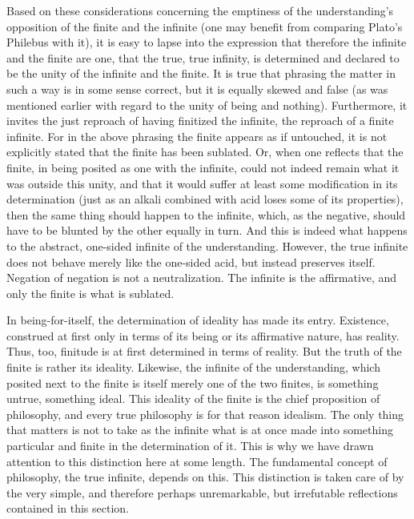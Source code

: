 Based on these considerations concerning the emptiness of
the understanding's opposition of the finite and the infinite
(one may benefit from comparing Plato's Philebus with it),
it is easy to lapse into the expression that therefore
the infinite and the finite are one, that the true,
true infinity, is determined and declared to be
the unity of the infinite and the finite.
It is true that phrasing the matter in such a way is
in some sense correct, but it is equally skewed and false
(as was mentioned earlier with regard to the unity of being and nothing).
Furthermore, it invites the just reproach of having
finitized the infinite, the reproach of a finite infinite.
For in the above phrasing the finite appears as if untouched,
it is not explicitly stated that the finite has been sublated.
Or, when one reflects that the finite, in being posited as one with the
infinite, could not indeed remain what it was outside this unity, and
that it would suffer at least some modification in its determination
(just as an alkali combined with acid loses some of its properties),
then the same thing should happen to the infinite, which, as the
negative, should have to be blunted by the other equally in turn.
And this is indeed what happens to the abstract, one-sided infinite
of the understanding.
However, the true infinite does not behave merely like
the one-sided acid, but instead preserves itself.
Negation of negation is not a neutralization.
The infinite is the affirmative,
and only the finite is what is sublated.

In being-for-itself, the determination of
ideality has made its entry.
Existence, construed at first only
in terms of its being or
its affirmative nature, has reality.
Thus, too, finitude is at first
determined in terms of reality.
But the truth of the finite is rather its ideality.
Likewise, the infinite of the understanding,
which posited next to the finite is
itself merely one of the two finites,
is something untrue, something ideal.
This ideality of the finite is the
chief proposition of philosophy,
and every true philosophy is
for that reason idealism.
The only thing that matters is not to take as the infinite
what is at once made into something particular and finite
in the determination of it.
This is why we have drawn attention to
this distinction here at some length.
The fundamental concept of philosophy,
the true infinite, depends on this.
This distinction is taken care of
by the very simple, and therefore perhaps unremarkable,
but irrefutable reflections contained in this section.

